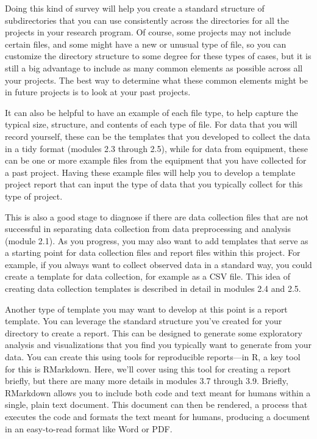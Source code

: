 \documentclass[]{tufte-book}
\begin{document}
Doing this kind of survey will help you create a standard structure of
subdirectories that you can use consistently across the directories for all the
projects in your research program. Of course, some projects may not include
certain files, and some might have a new or unusual type of file, so you can
customize the directory structure to some degree for these types of cases, but
it is still a big advantage to include as many common elements as possible
across all your projects. The best way to determine what these common elements
might be in future projects is to look at your past projects.

It can also be helpful to have an example of each file type, to help capture
the typical size, structure, and contents of each type of file. For
data that you will record yourself, these can be the templates that you
developed to collect the data in a tidy format (modules 2.3 through 2.5), while
for data from equipment, these can be one or more example files from the
equipment that you have collected for a past project. Having these example files
will help you to develop a template project report that can input the type of
data that you typically collect for this type of project.

This is also a good stage to diagnose if there are data collection files that
are not successful in separating data collection from data preprocessing and
analysis (module 2.1). As you progress, you may also want to add templates that
serve as a starting point for data collection files and report files within this
project. For example, if you always want to collect observed data in a standard
way, you could create a template for data collection, for example as a CSV file.
This idea of creating data collection templates is described in detail in
modules 2.4 and 2.5.

Another type of template you may want to develop at this point is a report
template. You can leverage the standard structure you've created for your
directory to create a report. This can be designed to generate some exploratory
analysis and visualizations that you find you typically want to generate from
your data. You can create this using tools for reproducible reports---in R, a
key tool for this is RMarkdown. Here, we'll cover using this tool for creating a
report briefly, but there are many more details in modules 3.7 through 3.9.
Briefly, RMarkdown allows you to include both code and text meant for humans
within a single, plain text document. This document can then be rendered, a
process that executes the code and formats the text meant for humans, producing
a document in an easy-to-read format like Word or PDF.
\end{document}
